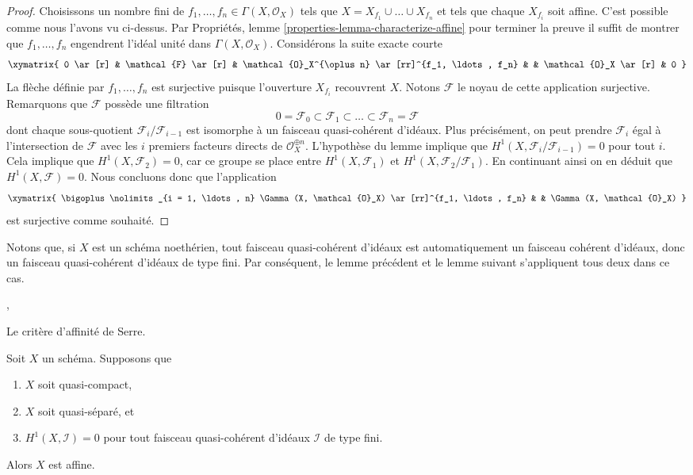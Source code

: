 \begin{proof}
\medskip\noindent
Choisissons un nombre fini de $f_1, \ldots, f_n \in \Gamma(X, \mathcal{O}_X)$
tels que $X = X_{f_1} \cup \ldots \cup X_{f_n}$ et tels que chaque
$X_{f_i}$ soit affine. C'est possible comme nous l'avons vu ci-dessus.
Par Propriétés, lemme \ref{properties-lemma-characterize-affine}
pour terminer la preuve il suffit
de montrer que $f_1, \ldots, f_n$ engendrent l'idéal unité dans
$\Gamma(X, \mathcal{O}_X)$. Considérons la suite exacte courte
$$
\xymatrix{
0 \ar[r] &
\mathcal{F} \ar[r] &
\mathcal{O}_X^{\oplus n} \ar[rr]^{f_1, \ldots, f_n} & &
\mathcal{O}_X \ar[r] &
0
}
$$
La flèche définie par $f_1, \ldots, f_n$ est surjective puisque
l'ouverture $X_{f_i}$ recouvrent $X$. Notons $\mathcal{F}$ le noyau de
cette application surjective.
Remarquons que $\mathcal{F}$ possède une filtration
$$
0 = \mathcal{F}_0 \subset \mathcal{F}_1 \subset
\ldots \subset \mathcal{F}_n = \mathcal{F}
$$
dont chaque sous-quotient $\mathcal{F}_i/\mathcal{F}_{i - 1}$ est
isomorphe à un faisceau quasi-cohérent d'idéaux. Plus
précisément, on peut prendre $\mathcal{F}_i$ égal à l'intersection de
$\mathcal{F}$ avec les $i$ premiers facteurs directs de
$\mathcal{O}_X^{\oplus n}$.
L'hypothèse
du lemme implique que $H^1(X, \mathcal{F}_i/\mathcal{F}_{i - 1}) = 0$
pour tout $i$. Cela implique que
$H^1(X, \mathcal{F}_2) = 0$, car ce groupe se place entre
$H^1(X, \mathcal{F}_1)$ et $H^1(X, \mathcal{F}_2/\mathcal{F}_1)$.
En continuant ainsi on en déduit que $H^1(X, \mathcal{F}) = 0$.
Nous concluons donc que l'application
$$
\xymatrix{
\bigoplus\nolimits_{i = 1, \ldots, n} \Gamma(X, \mathcal{O}_X)
\ar[rr]^{f_1, \ldots, f_n} & &
\Gamma(X, \mathcal{O}_X)
}
$$
est surjective comme souhaité.
\end{proof}

\noindent
Notons que, si $X$ est un schéma noethérien, tout faisceau quasi-cohérent
d'idéaux est automatiquement un faisceau cohérent d'idéaux, donc un faisceau quasi-cohérent
d'idéaux de type fini. Par conséquent, le
lemme précédent et le lemme suivant s'appliquent tous deux dans ce cas.

\begin{lemma}
\label{lemma-quasi-separated-h1-zero-covering}
\begin{reference}
\cite{Serre-criterion}, \cite[II, Théorème 5.2.1]{EGA}
\end{reference}
\begin{slogan}
Le critère d'affinité de Serre.
\end{slogan}
Soit $X$ un schéma. Supposons que
\begin{enumerate}
\item $X$ soit quasi-compact,
\item $X$ soit quasi-séparé, et
\item $H^1(X, \mathcal{I}) = 0$ pour tout faisceau
quasi-cohérent d'idéaux $\mathcal{I}$ de type fini.
\end{enumerate}
Alors $X$ est affine.
\end{lemma}

